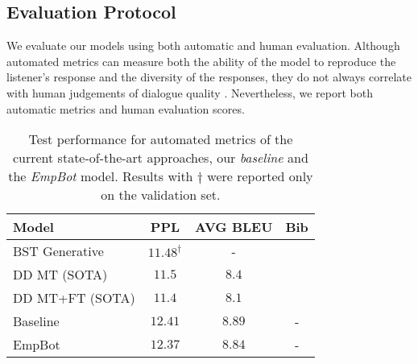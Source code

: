 \documentclass[11pt]{article}
\begin{document}
\subsection{Evaluation Protocol}\label{subsec:EvaluationMetrics}
We evaluate our models using both automatic and human evaluation. Although automated metrics can measure both the ability of the model to reproduce the listener's response and the diversity of the responses, they do not always correlate with human judgements of dialogue quality \citep{liu_2016_how_not_to_eval}. Nevertheless, we report both automatic metrics and human evaluation scores. 
\begin{table*}[t!]
\centering
\begin{tabular}{lccc}
\hline
Model &  PPL &  AVG BLEU & Bib \\
\hline
BST Generative & $11.48^{\dagger}$ & - & \citep{roller_2020_fb_recipes_blender}\\
DD MT (SOTA) & $11.5$ & $8.4$ & \citep{shuster_2019_dodeca_dialogues}\\
DD MT+FT (SOTA)& $\mathbf{11.4}$ & $8.1$ & \citep{shuster_2019_dodeca_dialogues}\\
Baseline & $12.41$  &  $\mathbf{8.89}$ & -  \\ 
EmpBot  &  $12.37$ & $\mathbf{8.84}$ & - \\\hline
\end{tabular}
\caption{Test performance for automated metrics of the current state-of-the-art approaches, our \textit{baseline} and the \textit{EmpBot} model. Results with $\dagger$ were reported only on the validation set.}
\label{tab:auto_metrics}
\end{table*}
\end{document}
